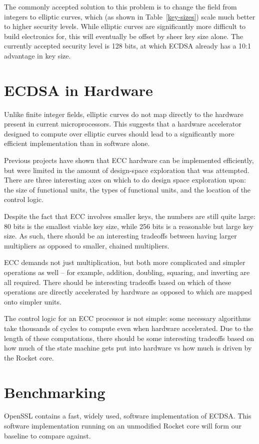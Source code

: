 \documentclass[twocolumn]{article}
\begin{document}
The commonly accepted solution to this problem is to change the field
from integers to elliptic curves, which (as shown in
Table~\ref{key-sizes}) scale much better to higher security levels.
While elliptic curves are significantly more difficult to build
electronics for, this will eventually be offset by sheer key size
alone.  The currently accepted security level is 128 bits, at which
ECDSA already has a 10:1 advantage in key size.

\section{ECDSA in Hardware}

Unlike finite integer fields, elliptic curves do not map directly to
the hardware present in current microprocessors\cite{kss-ecdsa}.  This
suggests that a hardware accelerator designed to compute over elliptic
curves should lead to a significantly more efficient implementation
than in software alone.

Previous projects\cite{nnll-ecdsa_hw} have shown that ECC hardware can
be implemented efficiently, but were limited in the amount of
design-space exploration that was attempted\cite{mmm-hw_ecc}.  There
are three interesting axes on which to do design space exploration
upon: the size of functional units, the types of functional units, and
the location of the control logic.

Despite the fact that ECC involves smaller keys, the numbers are still
quite large: 80 bits is the smallest viable key size, while 256 bits
is a reasonable but large key size.  As such, there should be an
interesting tradeoffs between having larger multipliers as opposed to
smaller, chained multipliers.

ECC demands not just multiplication, but both more complicated and
simpler operations as well -- for example, addition, doubling,
squaring, and inverting are all required.  There should be interesting
tradeoffs based on which of these operations are directly accelerated
by hardware as opposed to which are mapped onto simpler units.

The control logic for an ECC processor is not simple: some necessary
algorithms take thousands of cycles\cite{mmm-hw_ecc} to compute even
when hardware accelerated.  Due to the length of these computations,
there should be some interesting tradeoffs based on how much of the
state machine gets put into hardware vs how much is driven by the
Rocket core.

\section{Benchmarking}

OpenSSL contains a fast, widely used, software implementation of
ECDSA\cite{kasper-openssl_ecc}.  This software implementation running
on an unmodified Rocket core will form our baseline to compare
against.



\end{document}
